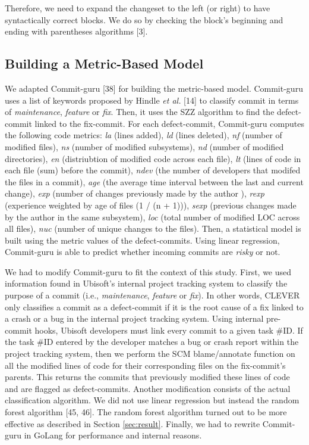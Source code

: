 \documentclass[sigconf]{acmart}
\begin{document}
Therefore, we need to expand the changeset to the left (or right) to
have syntactically correct blocks. We do so by checking the block's
beginning and ending with parentheses algorithms [3].

\subsection{Building a Metric-Based Model}\label{sec:metric-based}

We adapted Commit-guru [38] for building the metric-based model.
Commit-guru uses a list of keywords proposed by Hindle \emph{et al.}
[14] to classify commit in terms of \emph{maintenance},
\emph{feature} or \emph{fix}. Then, it uses the SZZ algorithm to find
the defect-commit linked to the fix-commit. For each defect-commit,
Commit-guru computes the following code metrics: \emph{la} (lines
added), \emph{ld} (lines deleted), \emph{nf} (number of modified files),
\emph{ns} (number of modified subsystems), \emph{nd} (number of modified
directories), \emph{en} (distriubtion of modified code across each
file), \emph{lt} (lines of code in each file (sum) before the commit),
\emph{ndev} (the number of developers that modifed the files in a
commit), \emph{age} (the average time interval between the last and
current change), \emph{exp} (number of changes previously made by the
author ), \emph{rexp} (experience weighted by age of files (1 / (n +
1))), \emph{sexp} (previous changes made by the author in the same
subsystem), \emph{loc} (total number of modified LOC across all files),
\emph{nuc} (number of unique changes to the files). Then, a statistical
model is built using the metric values of the defect-commits. Using
linear regression, Commit-guru is able to predict whether incoming
commits are \emph{risky} or not.

We had to modify Commit-guru to fit the context of this study. First, we
used information found in Ubisoft's internal project tracking system to
classify the purpose of a commit (i.e., \emph{maintenance},
\emph{feature} or \emph{fix}). In other words, CLEVER only classifies a
commit as a defect-commit if it is the root cause of a fix linked to a
crash or a bug in the internal project tracking system. Using internal
pre-commit hooks, Ubisoft developers must link every commit to a given
task \#ID. If the task \#ID entered by the developer matches a bug or
crash report within the project tracking system, then we perform the SCM
blame/annotate function on all the modified lines of code for their
corresponding files on the fix-commit's parents. This returns the
commits that previously modified these lines of code and are flagged as
defect-commits. Another modification consists of the actual
classification algorithm. We did not use linear regression but instead
the random forest algorithm [45, 46]. The random forest algorithm
turned out to be more effective as described in Section
\ref{sec:result}. Finally, we had to rewrite Commit-guru in GoLang for
performance and internal reasons.
\end{document}
